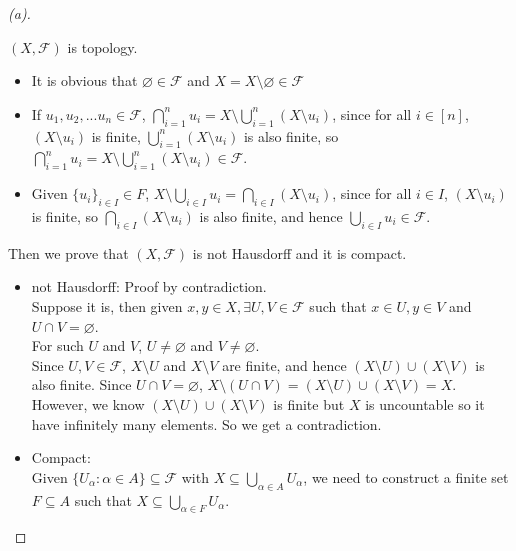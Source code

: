 \begin{proof}[(a)]
\vphantom{text}
    \begin{claim}
        $(X, \mathcal{F})$ is topology.
    \end{claim}
    \begin{explanation}
        \vphantom{text}
        \begin{itemize}
            \item It is obvious that $\varnothing \in \mathcal{F}$ and $X = X \setminus \varnothing \in \mathcal{F}$
            \item If $u_1, u_2, ... u_n \in \mathcal{F}$, $\bigcap_{i=1}^{n}u_i = X \setminus \bigcup_{i=1}^{n} (X \setminus u_i)$, since for all $i \in [n]$, $(X \setminus u_i)$ is finite, $\bigcup_{i=1}^{n} (X \setminus u_i)$ is also finite, so $\bigcap_{i=1}^{n}u_i = X \setminus \bigcup_{i=1}^{n} (X \setminus u_i) \in \mathcal{F}$.
            \item Given $\{u_i\}_{i \in I} \in F$, $X \setminus \bigcup_{i \in I}u_i = \bigcap_{i \in I} (X \setminus u_i)$, since for all $i \in I$, $(X \setminus u_i)$ is finite, so $\bigcap_{i \in I} (X \setminus u_i)$ is also finite, and hence $\bigcup_{i \in I}u_i \in \mathcal{F}$.
        \end{itemize}
    \end{explanation}
    Then we prove that $(X, \mathcal{F})$ is not Hausdorff and it is compact.
    \begin{itemize}
        \item not Hausdorff: Proof by contradiction. \\
        Suppose it is, then given $x,y \in X, \exists U,V \in \mathcal{F}$ such that $x \in U, y \in V$ and $U \cap V = \varnothing$. \\
        For such $U$ and $V$, $U \neq \varnothing$ and $V \neq \varnothing$. \\
        Since $U, V \in \mathcal{F}$, $X \setminus U$ and $X \setminus V$ are finite, and hence $(X \setminus U) \cup (X \setminus V)$ is also finite. Since $U \cap V = \varnothing$, $X \setminus (U \cap V) = (X \setminus U) \cup (X \setminus V) = X$. However, we know $(X \setminus U) \cup (X \setminus V)$ is finite but $X$ is uncountable so it have infinitely many elements. So we get a contradiction.
        \item Compact:\\
        Given $\{U_{\alpha} : \alpha \in A\} \subseteq \mathcal{F}$ with $X \subseteq \bigcup_{\alpha \in A} U_{\alpha}$, we need to construct a finite set $F \subseteq A$ such that $X \subseteq \bigcup_{\alpha \in F} U_{\alpha}$. \\

\end{itemize}
\end{proof}
